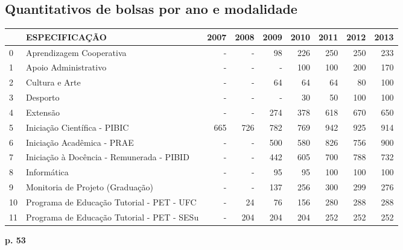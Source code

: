 \documentclass{report}
\begin{document}
\subsection{Quantitativos de bolsas por ano e modalidade}

\begin{tabular}{llrrrrrrr}
\toprule
{} &                               ESPECIFICAÇÃO &  2007 &  2008 &  2009 &  2010 &  2011 &  2012 &  2013 \\
\midrule
0  &                    Aprendizagem Cooperativa &     - &     - &    98 &   226 &   250 &   250 &   233 \\
1  &                        Apoio Administrativo &     - &     - &     - &   100 &   100 &   200 &   170 \\
2  &                              Cultura e Arte &     - &     - &    64 &    64 &    64 &    80 &   100 \\
3  &                                    Desporto &     - &     - &     - &    30 &    50 &   100 &   100 \\
4  &                                    Extensão &     - &     - &   274 &   378 &   618 &   670 &   650 \\
5  &                Iniciação Científica - PIBIC &   665 &   726 &   782 &   769 &   942 &   925 &   914 \\
6  &                  Iniciação Acadêmica - PRAE &     - &     - &   500 &   580 &   826 &   756 &   900 \\
7  &   Iniciação à Docência - Remunerada - PIBID &     - &     - &   442 &   605 &   700 &   788 &   732 \\
8  &                                 Informática &     - &     - &    95 &    95 &   100 &   100 &   100 \\
9  &            Monitoria de Projeto (Graduação) &     - &     - &   137 &   256 &   300 &   299 &   276 \\
10 &   Programa de Educação Tutorial - PET - UFC &     - &    24 &    76 &   156 &   280 &   288 &   288 \\
11 &  Programa de Educação Tutorial - PET - SESu &     - &   204 &   204 &   204 &   252 &   252 &   252 \\
\bottomrule
\end{tabular}

\textbf{p. 53}
\end{document}

